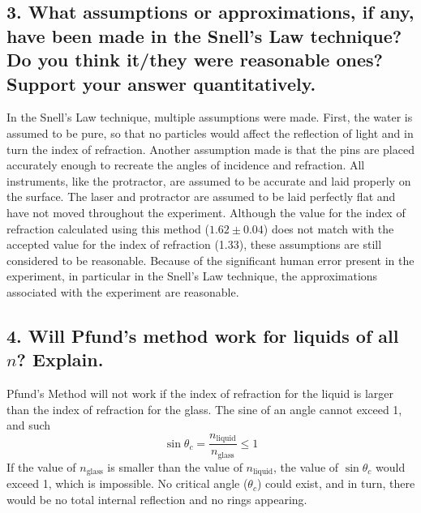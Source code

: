 \documentclass[12pt]{article}
\begin{document}
\subsection*{3. What assumptions or approximations, if any, have been made in the Snell's Law technique? Do you think it/they were reasonable ones? Support your answer quantitatively.}
    In the Snell's Law technique, multiple assumptions were made. First, the water is assumed to be pure, so that no particles would affect the reflection of light and in turn the index of refraction. Another assumption made is that the pins are placed accurately enough to recreate the angles of incidence and refraction. All instruments, like the protractor, are assumed to be accurate and laid properly on the surface. The laser and protractor are assumed to be laid perfectly flat and have not moved throughout the experiment.
    Although the value for the index of refraction calculated using this method ($1.62 \pm 0.04$) does not match with the accepted value for the index of refraction (1.33), these assumptions are still considered to be reasonable. Because of the significant human error present in the experiment, in particular in the Snell's Law technique, the approximations associated with the experiment are reasonable.
\subsection*{4. Will Pfund’s method work for liquids of all $n$? Explain.}
    Pfund's Method will not work if the index of refraction for the liquid is larger than the index of refraction for the glass. The sine of an angle cannot exceed 1, and such \[\sin\theta_c=\frac{n_{\text{liquid}}}{n_{\text{glass}}}\le 1\]
    If the value of $n_{\text{glass}}$ is smaller than the value of $n_{\text{liquid}}$, the value of $\sin\theta_c$ would exceed 1, which is impossible. No critical angle ($\theta_c$) could exist, and in turn, there would be no total internal reflection and no rings appearing.
\end{document}
